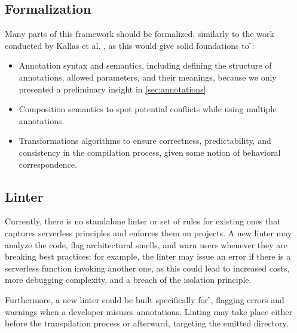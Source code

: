 \subsection{Formalization}

Many parts of this framework should be formalized, similarly to the work conducted by Kallas et al. \cite{formalization},
as this would give solid foundations to \f{}:

\begin{itemize}
  \item Annotation syntax and semantics, including defining
    the structure of annotations, allowed parameters, and their meanings,
    because we only presented a preliminary insight in \cref{sec:annotations}.

  \item Composition semantics to spot potential conflicts while using multiple annotations.

  \item Transformations algorithms to ensure correctness, predictability,
    and consistency in the compilation process, given some notion of behavioral correspondence.
\end{itemize}

\subsection{Linter}

Currently, there is no standalone linter or set of rules for existing ones
that captures serverless principles and enforces them on projects.
A new linter may analyze the code, flag architectural smells,
and warn users whenever they are breaking best practices:
for example, the linter may issue an error if there is a serverless function invoking another one,
as this could lead to increased costs, more debugging complexity, and a breach of the isolation principle.

Furthermore, a new linter could be built specifically for \f{},
flagging errors and warnings when a developer misuses annotations.
Linting may take place either before the transpilation process or afterward, targeting the emitted directory.
